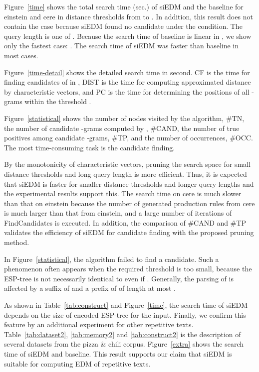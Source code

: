 \documentclass[12pt,a4paper]{scrartcl}
\begin{document}
Figure~\ref{time} shows the total search time (sec.) of siEDM and the baseline 
for einstein and cere in distance thresholds 
from  to .
In addition, this result does not contain the case  because siEDM found no candidate under the condition.
The query length is one of . 
Because the search time of baseline is linear in , we show only the fastest case: .
The search time of siEDM  was faster than baseline in most cases.

Figure~\ref{time-detail} shows the detailed search time in second.
CF is the time for finding candidates of  in ,
DIST is the time for computing approximated  distance by characteristic vectors,
and PC is the time for determining the positions of all -grams within the threshold .

Figure~\ref{statistical} shows the number of nodes  visited by the algorithm, \#TN,
the number of candidate -grams computed by , \#CAND,
the number of true positives among candidate -grams, \#TP, and the number of occurrences, \#OCC.
The most time-consuming task is the candidate finding. 

By the monotonicity of characteristic vectors, 
pruning the search space for small distance thresholds and long query length is more efficient. 
Thus, it is expected that siEDM is faster for smaller distance thresholds and longer query lengths
and the experimental results support this.
The search time on cere is much slower than that on einstein
because the number of generated production rules from cere is much larger than that from einstein,
and a large number of iterations of {\sc FindCandidates} is executed.
In addition, the comparison of \#CAND and \#TP validates the efficiency of siEDM for candidate finding 
with the proposed pruning method.

In Figure~\ref{statistical}, the algorithm failed to find a candidate.
Such a phenomenon often appears when the required threshold  is too small, 
because the ESP-tree  is not necessarily identical to  even if .
Generally, the parsing of  is affected by a suffix of  and a prefix of  of length at most . 

As shown in Table~\ref{tab:construct} and Figure~\ref{time},
the search time of siEDM depends on the size of encoded ESP-tree for the input.
Finally, we confirm this feature by an additional experiment for other repetitive texts.
Table~\ref{tab:dataset2}, \ref{tab:memory2} and \ref{tab:construct2} is 
the description of several datasets from the pizza \& chili corpus.
Figure~\ref{extra} shows the search time of siEDM and baseline. 
This result supports our claim that siEDM is suitable for computing EDM of repetitive texts.
\end{document}
